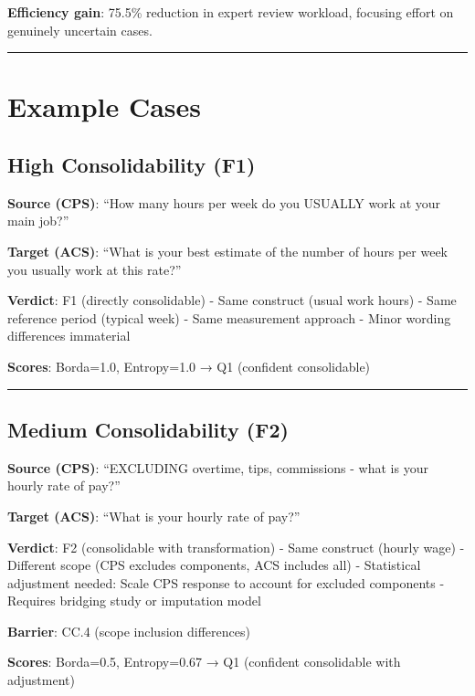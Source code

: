 \documentclass[
  letterpaper,
]{report}
\begin{document}
\textbf{Efficiency gain}: 75.5\% reduction in expert review workload,
focusing effort on genuinely uncertain cases.

\begin{center}\rule{0.5\linewidth}{0.5pt}\end{center}

\section{Example Cases}\label{example-cases}

\subsection{High Consolidability (F1)}\label{high-consolidability-f1}

\textbf{Source (CPS)}: ``How many hours per week do you USUALLY work at
your main job?''

\textbf{Target (ACS)}: ``What is your best estimate of the number of
hours per week you usually work at this rate?''

\textbf{Verdict}: F1 (directly consolidable) - Same construct (usual
work hours) - Same reference period (typical week) - Same measurement
approach - Minor wording differences immaterial

\textbf{Scores}: Borda=1.0, Entropy=1.0 → Q1 (confident consolidable)

\begin{center}\rule{0.5\linewidth}{0.5pt}\end{center}

\subsection{Medium Consolidability
(F2)}\label{medium-consolidability-f2}

\textbf{Source (CPS)}: ``EXCLUDING overtime, tips, commissions - what is
your hourly rate of pay?''

\textbf{Target (ACS)}: ``What is your hourly rate of pay?''

\textbf{Verdict}: F2 (consolidable with transformation) - Same construct
(hourly wage) - Different scope (CPS excludes components, ACS includes
all) - Statistical adjustment needed: Scale CPS response to account for
excluded components - Requires bridging study or imputation model

\textbf{Barrier}: CC.4 (scope inclusion differences)

\textbf{Scores}: Borda=0.5, Entropy=0.67 → Q1 (confident consolidable
with adjustment)
\end{document}
